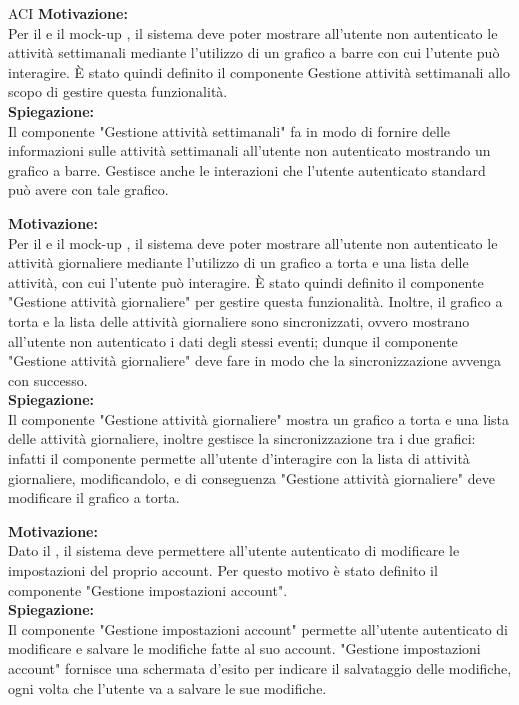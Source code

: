 \begin{listaPersonale}{ACI}
    \textbf{Motivazione:}\\
    Per il  e il mock-up , il sistema deve poter mostrare all'utente non autenticato le attività settimanali mediante l'utilizzo di un grafico a barre con cui l'utente può interagire. È stato quindi definito il componente Gestione attività settimanali allo scopo di gestire questa funzionalità.\\
    \textbf{Spiegazione:}\\
    Il componente "Gestione attività settimanali" fa in modo di fornire delle informazioni sulle attività settimanali all'utente non autenticato mostrando un grafico a barre. Gestisce anche le interazioni che l'utente autenticato standard può avere con tale grafico.


    \textbf{Motivazione:}\\
    Per il  e il mock-up , il sistema deve poter mostrare all'utente non autenticato le attività giornaliere mediante l'utilizzo di un grafico a torta e una lista delle attività, con cui l'utente può interagire. È stato quindi definito il componente "Gestione attività giornaliere" per gestire questa funzionalità. Inoltre, il grafico a torta e la lista delle attività giornaliere sono sincronizzati, ovvero mostrano all'utente non autenticato i dati degli stessi eventi; dunque il componente "Gestione attività giornaliere" deve fare in modo che la sincronizzazione avvenga con successo.\\
    \textbf{Spiegazione:}\\
    Il componente "Gestione attività giornaliere" mostra un grafico a torta e una lista delle attività giornaliere, inoltre gestisce la sincronizzazione tra i due grafici: infatti il componente permette all'utente d'interagire con la lista di attività giornaliere, modificandolo, e di conseguenza "Gestione attività giornaliere" deve modificare il grafico a torta.


    \textbf{Motivazione:}\\
    Dato il , il sistema deve permettere all'utente autenticato di modificare le impostazioni del proprio account. Per questo motivo è stato definito il componente "Gestione impostazioni account".\\
    \textbf{Spiegazione:}\\
    Il componente "Gestione impostazioni account" permette all'utente autenticato di modificare e salvare le modifiche fatte al suo account.
    "Gestione impostazioni account" fornisce una schermata d'esito per indicare il salvataggio delle modifiche, ogni volta che l'utente va a salvare le sue modifiche.



\end{listaPersonale}
